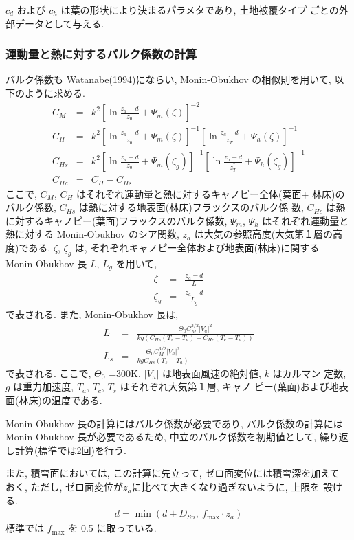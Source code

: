 $c_d$ および $c_h$ は葉の形状により決まるパラメタであり, 土地被覆タイプ
ごとの外部データとして与える.

\subsubsection{運動量と熱に対するバルク係数の計算}

バルク係数も Watanabe(1994)にならい, Monin-Obukhov の相似則を用いて, 以
下のように求める.
\begin{eqnarray}
 C_M &=& k^2 \left[ \ln \frac{z_a-d}{z_0} + \Psi_m(\zeta) \right]^{-2} \\
 C_H &=& k^2 \left[ \ln \frac{z_a-d}{z_0} + \Psi_m(\zeta) \right]^{-1}
             \left[ \ln \frac{z_a-d}{z_T} + \Psi_h(\zeta) \right]^{-1} \\
 C_{Hs} &=& k^2 \left[ \ln \frac{z_a-d}{z_0} + \Psi_m(\zeta_g) \right]^{-1}
             \left[ \ln \frac{z_a-d}{z_T^{\dagger}} + \Psi_h(\zeta_g) \right]^{-1} \\
 C_{Hc} &=& C_H - C_{Hs}
\end{eqnarray}
ここで, $C_M$, $C_H$ はそれぞれ運動量と熱に対するキャノピー全体(葉面$+$
林床)のバルク係数, $C_{Hs}$ は熱に対する地表面(林床)フラックスのバルク係
数, $C_{Hc}$ は熱に対するキャノピー(葉面)フラックスのバルク係数,
$\Psi_m$, $\Psi_h$ はそれぞれ運動量と熱に対する Monin-Obukhov のシア関数,
$z_a$ は大気の参照高度(大気第１層の高度)である.
$\zeta$, $\zeta_g$ は, それぞれキャノピー全体および地表面(林床)に関する
Monin-Obukhov 長 $L$, $L_g$ を用いて,
\begin{eqnarray}
 \zeta &=& \frac{z_a - d}{L} \\
 \zeta_g &=& \frac{z_a - d}{L_g}
\end{eqnarray}
で表される.
また, Monin-Obukhov 長は,
\begin{eqnarray}
 L &=& \frac{\Theta_0 C_M^{3/2}|V_a|^2}{kg(C_{Hs}(T_s - T_a) + C_{Hc}(T_c - T_a))} \\
 L_s &=& \frac{\Theta_0 C_M^{3/2}|V_a|^2}{kg C_{Hs}(T_s - T_a)}
\end{eqnarray}
で表される.
ここで, $\Theta_0$ =300K, $|V_a|$ は地表面風速の絶対値, $k$ はカルマン
定数, $g$ は重力加速度, $T_a$, $T_c$, $T_s$ はそれぞれ大気第１層, キャノ
ピー(葉面)および地表面(林床)の温度である.

Monin-Obukhov 長の計算にはバルク係数が必要であり, バルク係数の計算には
Monin-Obukhov 長が必要であるため, 中立のバルク係数を初期値として, 繰り返
し計算(標準では2回)を行う.

また, 積雪面においては, この計算に先立って, ゼロ面変位には積雪深を加えて
おく, ただし, ゼロ面変位が$z_a$に比べて大きくなり過ぎないように, 上限を
設ける.
\begin{eqnarray}
 d = \min( d + D_{Sn} ,\  f_{\max} \cdot z_a )
\end{eqnarray}
標準では $f_{\max}$ を 0.5 に取っている.

